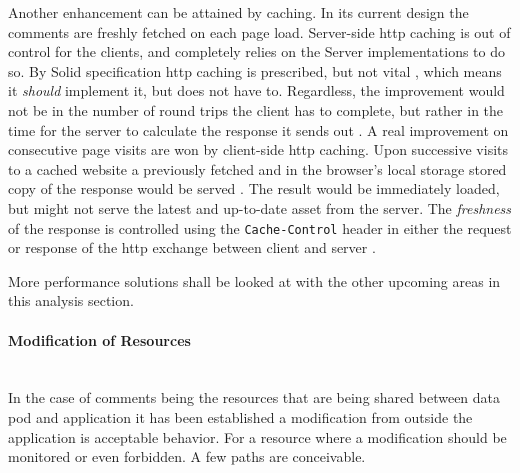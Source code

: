 Another enhancement can be attained by caching. In its current design the comments are freshly fetched on each page load. Server-side \gls{http} caching is out of control for the clients, and completely relies on the Server implementations to do so. By Solid specification \gls{http} caching is prescribed, but not vital \cite{solid-protocol}, which means it \textit{should} implement it, but does not have to. Regardless, the improvement would not be in the number of round trips the client has to complete, but rather in the time for the server to calculate the response it sends out \cite{http-caching}. A real improvement on consecutive page visits are won by client-side \gls{http} caching. Upon successive visits to a cached website a previously fetched and in the browser's local storage stored copy of the response would be served \cite{http-caching}. The result would be immediately loaded, but might not serve the latest and up-to-date asset from the server. The \textit{freshness} of the response is controlled using the \texttt{Cache-Control} header in either the request or response of the \gls{http} exchange between client and server \cite{http-caching}. 

More performance solutions shall be looked at with the other upcoming areas in this analysis section.
\vspace{0.5cm}
\paragraph{Modification of Resources}\mbox{}\\

In the case of comments being the resources that are being shared between data pod and application it has been established a modification from outside the application is acceptable behavior. For a resource where a modification should be monitored or even forbidden. A few paths are conceivable.

